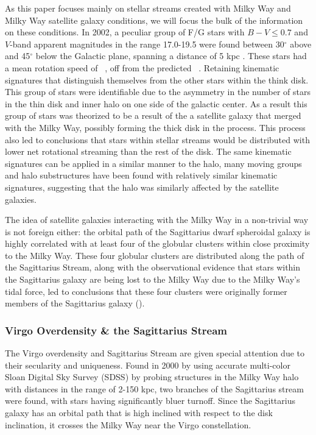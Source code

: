 \documentclass[twocolumn]{article}
\begin{document}
As this paper focuses mainly on stellar streams created with Milky Way and Milky Way satellite galaxy conditions, we will focus the bulk of the information on these conditions. In 2002, a peculiar group of F/G stars with $B-V \leq 0.7$ and $V$-band apparent magnitudes in the range 17.0-19.5 were found between 30$^\circ$ above and 45$^\circ$ below the Galactic plane, spanning a distance of 5 kpc \cite{lastMajorInvasion}. These stars had a mean rotation speed of ~,  off from the predicted ~. Retaining kinematic signatures that distinguish themselves from the other stars within the think disk. This group of stars were identifiable due to the asymmetry in the number of stars in the thin disk and inner halo on one side of the galactic center. As a result this group of stars was theorized to be a result of the a satellite galaxy that merged with the Milky Way, possibly forming the thick disk in the process. This process also led to conclusions that stars within stellar streams would be distributed with lower net rotational streaming than the rest of the disk. The same kinematic signatures can be applied in a similar manner to the halo, many moving groups and halo substructures have been found with relatively similar kinematic signatures, suggesting that the halo was similarly affected by the satellite galaxies. 

The idea of satellite galaxies interacting with the Milky Way in a non-trivial way is not foreign either: the orbital path of the Sagittarius dwarf spheroidal galaxy is highly correlated with at least four of the globular clusters within close proximity to the Milky Way. These four globular clusters are distributed along the path of the Sagittarius Stream, along with the observational evidence that stars within the Sagittarius galaxy are being lost to the Milky Way due to the Milky Way's tidal force, led to conclusions that these four clusters were originally former members of the Sagittarius galaxy (\cite{globlarClusters}).

\subsubsection{Virgo Overdensity \& the Sagittarius Stream} The Virgo overdensity and Sagittarius Stream are given special attention due to their secularity and uniqueness. Found in 2000 by  \cite{ghostOfSagittarius} using accurate multi-color Sloan Digital Sky Survey (SDSS) by probing structures in the Milky Way halo with distances in the range of 2-150 kpc, two branches of the Sagittarius stream were found, with stars having significantly bluer turnoff. Since the Sagittarius galaxy has an orbital path that is high inclined with respect to the disk inclination, it crosses the Milky Way near the Virgo constellation. 
\end{document}

